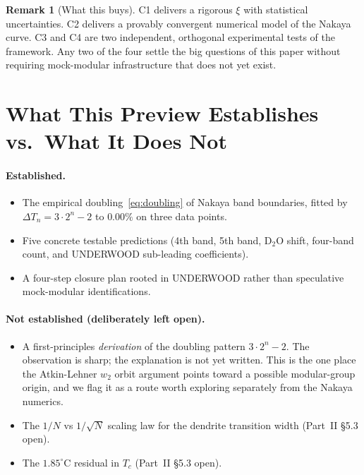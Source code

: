 \documentclass[11pt,letterpaper]{article}
\theoremstyle{plain}
\theoremstyle{definition}
\newtheorem{remark}[theorem]{Remark}
\begin{document}
\begin{remark}[What this buys]
C1 delivers a rigorous $\xi$ with statistical uncertainties.
C2 delivers a provably convergent numerical model of the Nakaya
curve.  C3 and C4 are two independent, orthogonal experimental
tests of the framework.  Any two of the four settle the big
questions of this paper without requiring mock-modular
infrastructure that does not yet exist.
\end{remark}

\section{What This Preview Establishes vs.\ What It Does Not}

\paragraph{Established.}
\begin{itemize}[leftmargin=2em,nosep]
\item The empirical doubling~\eqref{eq:doubling} of Nakaya band
  boundaries, fitted by $\Delta T_n = 3\cdot 2^n - 2$ to $0.00\%$
  on three data points.
\item Five concrete testable predictions (4th band, 5th band,
  D$_2$O shift, four-band count, and UNDERWOOD sub-leading
  coefficients).
\item A four-step closure plan rooted in UNDERWOOD rather than
  speculative mock-modular identifications.
\end{itemize}

\paragraph{Not established (deliberately left open).}
\begin{itemize}[leftmargin=2em,nosep]
\item A first-principles \emph{derivation} of the doubling pattern
  $3\cdot 2^n - 2$.  The observation is sharp; the explanation is
  not yet written.  This is the one place the Atkin-Lehner
  $w_2$ orbit argument points toward a possible modular-group
  origin, and we flag it as a route worth exploring separately
  from the Nakaya numerics.
\item The $1/N$ vs $1/\sqrt{N}$ scaling law for the dendrite
  transition width (Part~II \S5.3 open).
\item The $1.85^\circ$C residual in $T_c$ (Part~II \S5.3 open).
\end{itemize}
\end{document}

